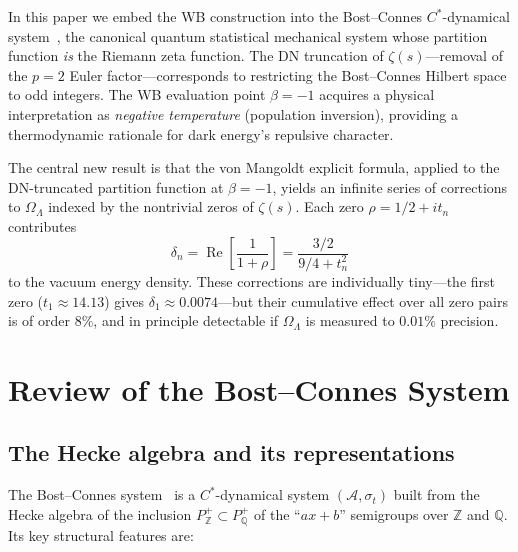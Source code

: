 \documentclass[12pt,a4paper]{article}
\newcommand{\OL}{\Omega_\Lambda}
\begin{document}
In this paper we embed the WB construction into the Bost--Connes $C^*$-dynamical system~\cite{BostConnes1995}, the canonical quantum statistical mechanical system whose partition function \emph{is} the Riemann zeta function. The DN truncation of $\zeta(s)$---removal of the $p=2$ Euler factor---corresponds to restricting the Bost--Connes Hilbert space to odd integers. The WB evaluation point $\beta = -1$ acquires a physical interpretation as \emph{negative temperature} (population inversion), providing a thermodynamic rationale for dark energy's repulsive character.

The central new result is that the von Mangoldt explicit formula, applied to the DN-truncated partition function at $\beta = -1$, yields an infinite series of corrections to $\OL$ indexed by the nontrivial zeros of $\zeta(s)$. Each zero $\rho = 1/2 + it_n$ contributes
\begin{equation}\label{eq:correction-preview}
  \delta_n = \operatorname{Re}\!\left[\frac{1}{1+\rho}\right] = \frac{3/2}{9/4 + t_n^2}
\end{equation}
to the vacuum energy density. These corrections are individually tiny---the first zero ($t_1 \approx 14.13$) gives $\delta_1 \approx 0.0074$---but their cumulative effect over all zero pairs is of order $8\%$, and in principle detectable if $\OL$ is measured to $0.01\%$ precision.

\section{Review of the Bost--Connes System}
\label{sec:BC-review}

\subsection{The Hecke algebra and its representations}

The Bost--Connes system~\cite{BostConnes1995,ConnesMarcolli2008} is a $C^*$-dynamical system $(\mathcal{A},\sigma_t)$ built from the Hecke algebra of the inclusion $P_\mathbb{Z}^+ \subset P_\mathbb{Q}^+$ of the ``$ax+b$'' semigroups over $\mathbb{Z}$ and $\mathbb{Q}$. Its key structural features are:
\end{document}
